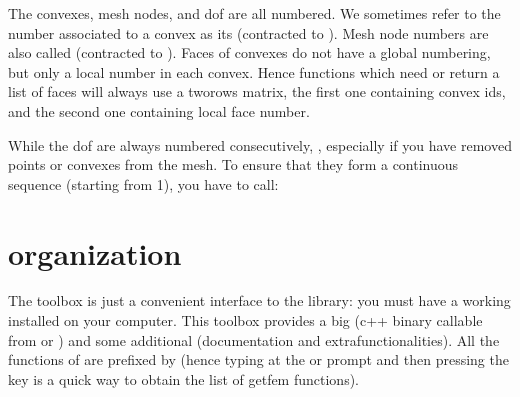\documentclass[a4paper,11pt,english]{sphinxmanual}
\begin{document}
The convexes, mesh nodes, and dof are all numbered. We sometimes refer to the
number associated to a convex as its  (contracted to
). Mesh node numbers are also called  (contracted
to ). Faces of convexes do not have a global numbering, but only a
local number in each convex. Hence functions which need or return a list of faces
will always use a two\sphinxhyphen{}rows matrix, the first one containing convex ids, and the
second one containing local face number.

While the dof are always numbered consecutively, , especially if you have removed points or convexes from
the mesh. To ensure that they form a continuous sequence (starting from 1), you
have to call:

\begin{sphinxVerbatim}[commandchars=\\\{\}]
 
\end{sphinxVerbatim}


\chapter{ organization}
\label{\detokenize{matlab_octave/mlabgf:gfm-organization}}\label{\detokenize{matlab_octave/mlabgf:mlab-mlabgf}}\label{\detokenize{matlab_octave/mlabgf::doc}}
The  toolbox is just a convenient interface to the  library: you must
have a working  installed on your computer. This toolbox provides a big
 (c++ binary callable from  or ) and some additional
 (documentation and extra\sphinxhyphen{}functionalities). All the functions of 
are prefixed by  (hence typing  at the  or  prompt and then
pressing the  key is a quick way to obtain the list of getfem
functions).
\end{document}
